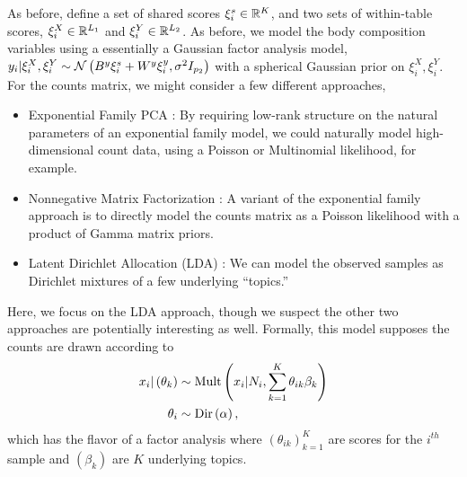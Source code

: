 \documentclass{article}
\begin{document}
As before, define a set of shared scores $\xi_{i}^{s} \in \mathbb{R}^{K}$, and two
sets of within-table scores, $\xi_{i}^{X} \in \mathbb{R}^{L_{1}}$ and $\xi_{i}^{Y}
\in \mathbb{R}^{L_{2}}$. As before, we model the body composition variables using a
essentially a Gaussian factor analysis model, $y_{i} \vert \xi_{i}^{X},
\xi_{i}^{Y} \sim \mathcal{N}\left(B^{y}\xi_{i}^s + W^y \xi_{i}^y,
\sigma^{2}I_{p_{2}}\right)$ with a spherical Gaussian prior on $\xi_{i}^{X},
\xi_{i}^{Y}$. For the counts matrix, we might consider a few different
approaches,

\begin{itemize}
\item Exponential Family PCA \citep{mohamed2009bayesian}: By requiring low-rank
  structure on the natural parameters of an exponential family model, we could
  naturally model high-dimensional count data, using a Poisson or Multinomial
  likelihood, for example.
\item Nonnegative Matrix Factorization \citep{lee2001algorithms}: A variant of
  the exponential family approach is to directly model the counts matrix as a
  Poisson likelihood with a product of Gamma matrix priors.
\item Latent Dirichlet Allocation (LDA) \citep{blei2003latent}: We can model the
  observed samples as Dirichlet mixtures of a few underlying ``topics.''
\end{itemize}

Here, we focus on the LDA approach, though we suspect the other two approaches
are potentially interesting as well. Formally, this model supposes the counts
are drawn according to
\begin{align*}
  x_{i} \vert \left(\theta_{k}\right) &\sim \textnormal{Mult}\left(x_{i} \vert N_{i},
  \sum_{k = 1}^{K} \theta_{ik} \beta_{k}\right) \\
  \theta_{i} &\sim \textnormal{Dir}\left(\alpha\right),
\end{align*}
which has the flavor of a factor analysis where $\left(\theta_{ik}\right)_{k
  =1}^{K}$ are scores for the $i^{th}$ sample and $\left(\beta_{k}\right)$ are
$K$ underlying topics.
\end{document}
